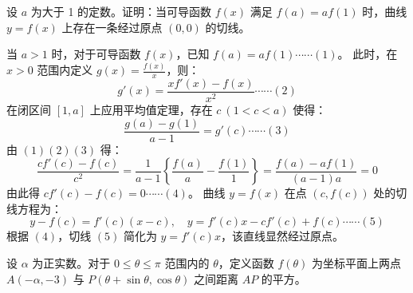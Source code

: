 \begin{questions}
\question
设 $a$ 为大于 1 的定数。证明：当可导函数 $f(x)$ 满足 $f(a) = a f(1)$ 时，曲线 $y = f(x)$ 上存在一条经过原点 $(0, 0)$ 的切线。
\begin{solution}
当 $a > 1$ 时，对于可导函数 $f(x)$，已知 $f(a) = a f(1) \cdots\cdots (1)$。
此时，在 $x > 0$ 范围内定义 $g(x) = \frac{f(x)}{x}$，则：
\[
g'(x) = \frac{x f'(x) - f(x)}{x^2} \cdots\cdots (2)
\]
在闭区间 $[1, a]$ 上应用平均值定理，存在 $c \ (1 < c < a)$ 使得：
\[
\frac{g(a) - g(1)}{a - 1} = g'(c) \cdots\cdots (3)
\]
由 $(1)(2)(3)$ 得：
\[
\frac{c f'(c) - f(c)}{c^2} = \frac{1}{a - 1} \left\{ \frac{f(a)}{a} - \frac{f(1)}{1} \right\} = \frac{f(a) - a f(1)}{(a - 1)a} = 0
\]
由此得 $c f'(c) - f(c) = 0 \cdots\cdots (4)$。
曲线 $y = f(x)$ 在点 $(c, f(c))$ 处的切线方程为：
\[
y - f(c) = f'(c)(x - c), \quad y = f'(c)x - c f'(c) + f(c) \cdots\cdots (5)
\]
根据 $(4)$，切线 $(5)$ 简化为 $y = f'(c)x$，该直线显然经过原点。
\end{solution}

\question
设 $\alpha$ 为正实数。对于 $0 \le \theta \le \pi$ 范围内的 $\theta$，定义函数 $f(\theta)$ 为坐标平面上两点 $A(-\alpha, -3)$ 与 $P(\theta + \sin \theta, \cos \theta)$ 之间距离 $AP$ 的平方。
\end{questions}
